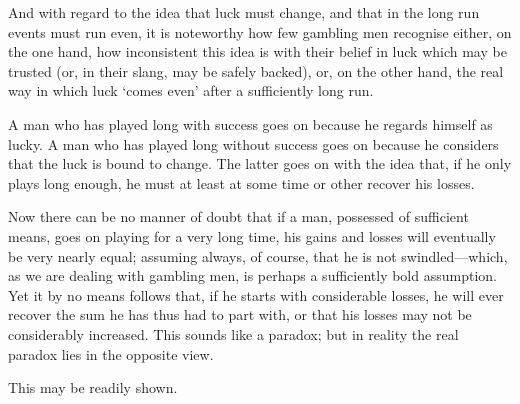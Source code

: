 \documentclass[letterpaper,12pt,oneside,openany]{memoir}
\begin{document}
And with regard to the idea that luck must change,
and that in the long run events must run even, it is
noteworthy how few gambling men recognise either, on
the one hand, how inconsistent this idea is with their
belief in luck which may be trusted (or, in their slang,
may be safely backed), or, on the other hand, the real
way in which luck `comes even' after a sufficiently
long run.

A man who has played long with success goes on
because he regards himself as lucky. A man who has
played long without success goes on because he considers
that the luck is bound to change. The latter goes on
with the idea that, if he only plays long enough, he
must at least at some time or other recover his losses.

Now there can be no manner of doubt that if a man,
possessed of sufficient means, goes on playing for a very
long time, his gains and losses will eventually be very
nearly equal; assuming always, of course, that he is not
swindled---which, as we are dealing with gambling
men, is perhaps a sufficiently bold assumption. Yet it
by no means follows that, if he starts with considerable
losses, he will ever recover the sum he has thus had to
part with, or that his losses may not be considerably
increased. This sounds like a paradox; but in reality
the real paradox lies in the opposite view.

This may be readily shown.
\end{document}
